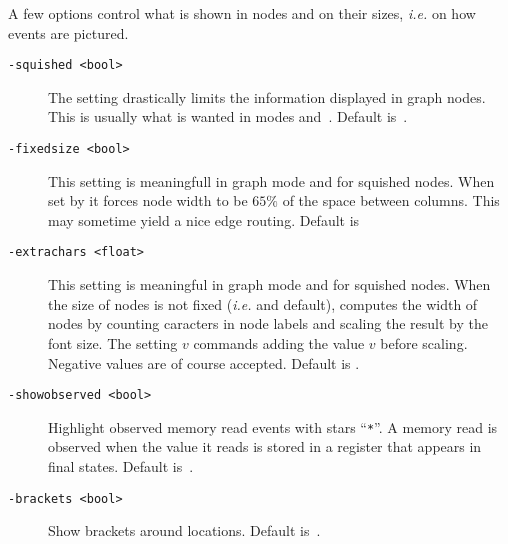 A few options control what is shown in nodes
and on their sizes, \emph{i.e.}
on how events are pictured.
\begin{description}
\item[{\tt -squished <bool>}] The setting  drastically
limits the information displayed in graph nodes. This is usually what
is wanted in modes  and~. Default is~.
\item[{\tt -fixedsize <bool>}] This setting is meaningfull in
 graph mode and for squished nodes. When set by
 it forces node width to be $65\%$ of the space
between columns. This may sometime yield a nice edge routing. Default is~
\item[{\tt -extrachars <float>}] This setting is meaningful in
 graph mode and for squished nodes.
When the size of nodes is not fixed (\emph{i.e.}  and default), \herd{} computes the width of nodes by counting caracters in node
labels and scaling the result by the font size.
The setting $v$ commands adding the value $v$ before scaling.
Negative values are of course accepted. Default is .
\item[{\tt -showobserved <bool>}] Highlight observed memory read events with
stars ``\texttt{*}''. A memory read is observed when the value it reads
is stored in a register that appears in final states.
Default is~.
\item[{\tt -brackets <bool>}] Show brackets around locations. Default
is~.
\end{description}

